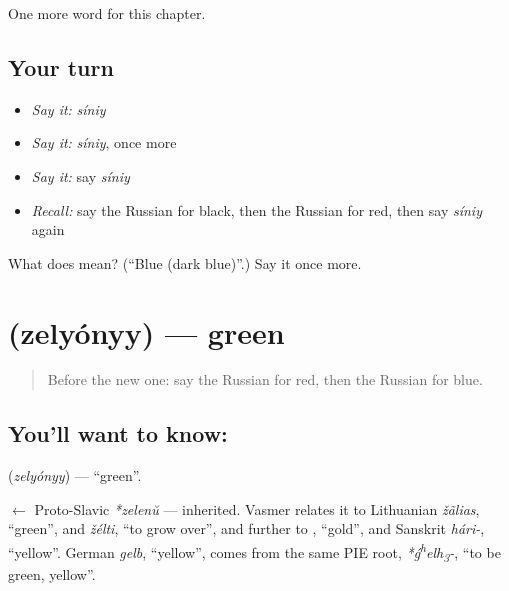 \begin{grammarlens}[title={What you've built}]
One more word for this chapter.
\end{grammarlens}

\subsection*{Your turn}
\begin{itemize}
\raggedright
  \item \emph{Say it:} \emph{síniy}
  \item \emph{Say it:} \emph{síniy}, once more
  \item \emph{Say it:} say \emph{síniy}
  \item \emph{Recall:} say the Russian for black, then the Russian for red, then say \emph{síniy} again
\end{itemize}

\begin{tcolorbox}[breakable,colback=teal!4,colframe=teal!35!black,title={Before you move on}]
What does  mean? (\textquotedblleft{}Blue (dark blue)\textquotedblright{}.) Say it once more.
\end{tcolorbox}
\section[\texorpdfstring{\ru{зелёный} (zelyónyy)}{зелёный (zelyónyy)}]{ (zelyónyy) — green}

\label{lesson:RU-C63-green}



\begin{quote}
Before the new one: say the Russian for red, then the Russian for blue.
\end{quote}

\subsection*{You'll want to know: }
\textbf{} (\emph{zelyónyy}) — \textquotedblleft{}green\textquotedblright{}.

\begin{cousinweb}
\textbf{} $\leftarrow$ Proto-Slavic \emph{*zelenŭ} — inherited. Vasmer relates it to Lithuanian \emph{žãlias}, \textquotedblleft{}green\textquotedblright{}, and \emph{žélti}, \textquotedblleft{}to grow over\textquotedblright{}, and further to \emph{}, \textquotedblleft{}gold\textquotedblright{}, and Sanskrit \emph{hári-}, \textquotedblleft{}yellow\textquotedblright{}. German \emph{gelb}, \textquotedblleft{}yellow\textquotedblright{}, comes from the same PIE root, \emph{*ǵ\textsuperscript{h}elh\textsubscript{3}-}, \textquotedblleft{}to be green, yellow\textquotedblright{}.
\end{cousinweb}

